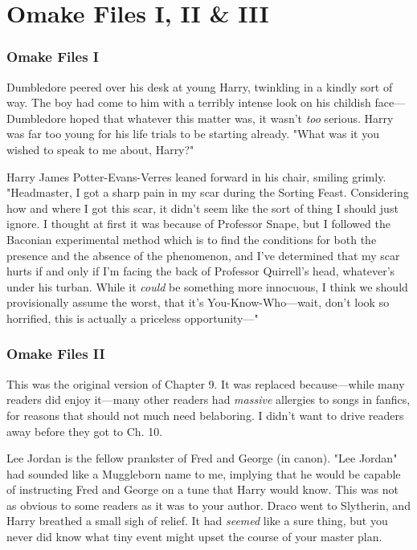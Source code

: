 \chapter{Omake Files I, II \& III}

\subsection{Omake Files I}
Dumbledore peered over his desk at young Harry, twinkling in a kindly sort of 
way. The boy had come to him with a terribly intense look on his childish 
face---Dumbledore hoped that whatever this matter was, it wasn't \emph{too} 
serious. Harry was far too young for his life trials to be starting already. 
"What was it you wished to speak to me about, Harry?"

Harry James Potter-Evans-Verres leaned forward in his chair, smiling grimly. 
"Headmaster, I got a sharp pain in my scar during the Sorting Feast. 
Considering how and where I got this scar, it didn't seem like the sort of 
thing I should just ignore. I thought at first it was because of Professor 
Snape, but I followed the Baconian experimental method which is to find the 
conditions for both the presence and the absence of the phenomenon, and I've 
determined that my scar hurts if and only if I'm facing the back of Professor 
Quirrell's head, whatever's under his turban. While it \emph{could} be 
something more innocuous, I think we should provisionally assume the worst, 
that it's You-Know-Who---wait, don't look so horrified, this is actually a 
priceless opportunity---"
\sbreak
\vspace{-2\baselineskip}
\subsection{Omake Files II}
This was the original version of Chapter 9. It was replaced because---while 
many readers did enjoy it---many other readers had \emph{massive} allergies to 
songs in fanfics, for reasons that should not much need belaboring. I didn't 
want to drive readers away before they got to Ch. 10.

Lee Jordan is the fellow prankster of Fred and George (in canon). "Lee Jordan" 
had sounded like a Muggleborn name to me, implying that he would be capable of 
instructing Fred and George on a tune that Harry would know. This was not as 
obvious to some readers as it was to your author.
\sbreak
Draco went to Slytherin, and Harry breathed a small sigh of relief. It had 
\emph{seemed} like a sure thing, but you never did know what tiny event might 
upset the course of your master plan.

